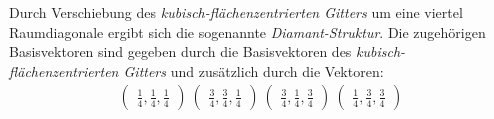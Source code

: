 Durch Verschiebung des \textit{kubisch-flächenzentrierten Gitters}
um eine viertel Raumdiagonale ergibt sich die sogenannte
\textit{Diamant-Struktur}.
Die zugehörigen Basisvektoren sind gegeben durch die
Basisvektoren des \textit{kubisch-flächenzentrierten Gitters}
und zusätzlich durch die Vektoren:
\begin{align}
\label{eqn:4*}
\begin{pmatrix}
\frac{1}{4}, \frac{1}{4}, \frac{1}{4}
\end{pmatrix}\
\begin{pmatrix}
\frac{3}{4}, \frac{3}{4}, \frac{1}{4}
\end{pmatrix}\
\begin{pmatrix}
\frac{3}{4}, \frac{1}{4}, \frac{3}{4}
\end{pmatrix}\
\begin{pmatrix}
\frac{1}{4}, \frac{3}{4}, \frac{3}{4}
\end{pmatrix}
\end{align}

